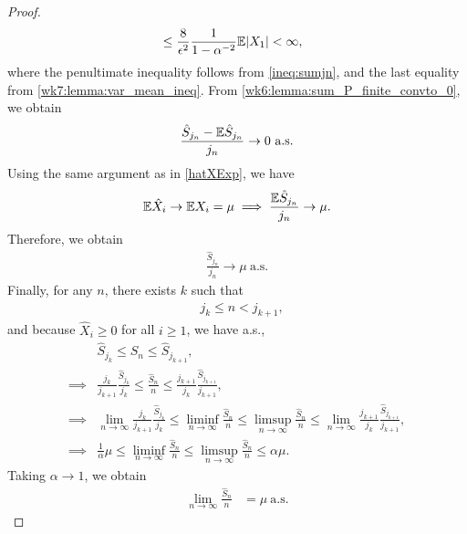 \documentclass[12pt]{article}
\begin{document}
\begin{proof}
\begin{align*}
&\leq \frac{8}{\epsilon^2} \frac{1}{1 - \alpha^{-2}} \E |X_1| < \infty,
\end{align*}
where the penultimate inequality follows from \cref{ineq:sumjn}, and the last equality from \cref{wk7:lemma:var_mean_ineq}. From \cref{wk6:lemma:sum_P_finite_convto_0}, we obtain
\begin{align*}
\frac{\hat{S}_{j_n} - \E \hat{S}_{j_n}}{j_n} \to 0 \ \text{a.s.}
\end{align*}
Using the same argument as in \cref{hatXExp}, we have
\begin{align*}
\E \hat{X}_i \to \E X_i = \mu
\implies
\frac{\E \hat{S}_{j_n}}{j_n} \to \mu.
\end{align*}
Therefore, we obtain
\begin{align*}
\frac{\hat{S}_{j_n}}{j_n} \to \mu \ \text{a.s.}
\end{align*}
Finally, for any $n$, there exists $k$ such that 
\begin{align*}
&j_k \leq n < j_{k+1}, 
\end{align*}
and because $\hat{X}_i \geq 0$ for all $i\geq 1$, we have a.s.,
\begin{align*}
&\hat{S}_{j_k} \leq \hat{S}_n \leq \hat{S}_{j_{k+1}}, \\
\implies
&\frac{j_k}{j_{k+1}} \frac{\hat{S}_{j_k}}{j_k} \leq \frac{\hat{S}_n}{n} \leq \frac{j_{k+1}}{j_k} \frac{\hat{S}_{j_{k+1}}}{j_{k+1}}, \\
\implies
&\lim_{n \to \infty} \frac{j_k}{j_{k+1}} \frac{\hat{S}_{j_k}}{j_k} \leq \liminf_{n \to \infty} \frac{\hat{S}_n}{n} \leq \limsup_{n \to \infty} \frac{\hat{S}_n}{n} \leq \lim_{n \to \infty} \frac{j_{k+1}}{j_k} \frac{\hat{S}_{j_{k+1}}}{j_{k+1}}, \\
\implies
&\frac{1}{\alpha} \mu \leq \liminf_{n \to \infty} \frac{\hat{S}_n}{n}\leq \limsup_{n \to \infty} \frac{\hat{S}_n}{n} \leq \alpha \mu.
\end{align*}
Taking $\alpha \to 1$, we obtain
\begin{align*}
\lim_{n \to \infty} \frac{\hat{S}_n}{n} &= \mu\ \text{a.s.}
\end{align*}
\end{proof}
%
%

\end{document}
